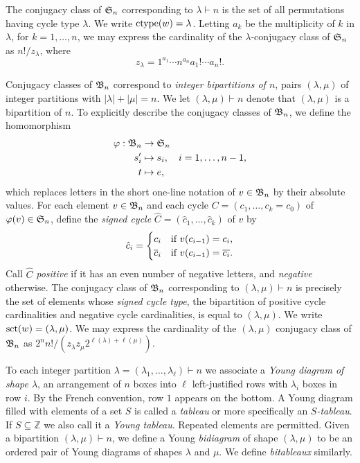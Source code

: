 \documentclass[11pt]{article}
\theoremstyle{definition}
\numberwithin{equation}{section}
\begin{document}
The conjugacy class of $\mathfrak{S}_n$ corresponding to $\lambda \vdash n$
is the set of all permutations having cycle type $\lambda$.  We write
$\mathrm{ctype}(w) = \lambda$. Letting
$a_k$ be the multiplicity of $k$ in $\lambda$, for $k =1,\dotsc,n$,
we may express the cardinality of the $\lambda$-conjugacy class of $\mathfrak{S}_n$ as
$n!/z_\lambda$, where
\begin{equation}\label{eq:zlambda}
 z_\lambda = {1^{a_1} \cdots n^{a_n} a_1! \cdots a_n!}.
\end{equation}

Conjugacy classes of $\mathfrak{B}_n$ correspond to
{\em integer bipartitions of $n$}, pairs $(\lambda,\mu)$
of integer partitions with 
$|\lambda| + |\mu| = n$.
We let
$(\lambda,\mu) \vdash n$ denote that $(\lambda,\mu)$ is
a bipartition of $n$. 
To explicitly describe the conjugacy classes of $\mathfrak{B}_n$,
we define the homomorphism
\begin{equation}\label{eq:varphi}
  \begin{aligned}
    \varphi: \bn &\rightarrow \sn \\
    s'_i &\mapsto s_i, \quad i=1,\dotsc,n-1,\\
    t &\mapsto e,
  \end{aligned}
  \end{equation}
which replaces letters in the short one-line notation of
$v \in \mathfrak{B}_n$ by their absolute values.
For each element $v \in \mathfrak{B}_n$
and each cycle $C = (c_1, \dotsc, c_k = c_0)$
of $\varphi(v) \in \mathfrak{S}_n$,
define the {\em signed cycle}
$\hat C = (\hat c_1, \dotsc, \hat c_k)$
of $v$ by
\begin{equation*}
  \hat c_i = \begin{cases}
  c_i &\text{if $v(c_{i-1}) = c_i$},\\
  \overline{c}_i &\text{if $v(c_{i-1}) = \overline{c_i}$}.
  \end{cases}
\end{equation*}
Call $\hat C$ {\em positive} if it has an even number of negative letters,
and {\em negative} otherwise.
The conjugacy class of $\mathfrak{B}_n$ corresponding to $(\lambda,\mu) \vdash n$
is precisely the set of elements  
whose {\em signed cycle type}, the bipartition of
positive cycle cardinalities and negative cycle cardinalities,
is equal to $(\lambda,\mu)$.
We write $\mathrm{sct}(w) = (\lambda,\mu)$.
We may express the cardinality of the $(\lambda,\mu)$
conjugacy class of $\mathfrak{B}_n$ as $2^nn!/(z_\lambda z_\mu 2^{\ell(\lambda) + \ell(\mu)})$.
  

To each integer partition
$\lambda = (\lambda_1, \dotsc, \lambda_\ell) \vdash n$
we associate a {\em Young diagram of shape $\lambda$},
an arrangement of $n$ boxes into $\ell$ left-justified rows
with $\lambda_i$ boxes in row $i$.  By the French convention, row $1$ appears
on the bottom.
A Young diagram filled with
elements of a set $S$ is called a {\em tableau} or more specifically an
{\em $S$-tableau}.  If $S \subseteq \mathbb Z$ we also call it a
{\em Young tableau}.
Repeated elements are permitted.
Given a bipartition $(\lambda,\mu) \vdash n$, we define
a Young {\em bidiagram} of shape $(\lambda,\mu)$
to be an ordered pair of Young diagrams of shapes $\lambda$ and $\mu$.
We define {\em bitableaux} similarly.
\end{document}
